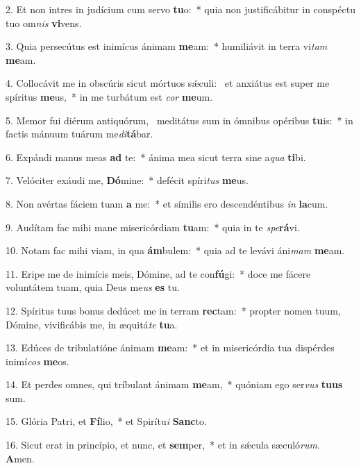 2. Et non intres in judícium cum servo \textbf{tu}o:~*  quia non justificábitur in conspéctu tuo om\textit{nis} \textbf{vi}vens.\

3. Quia persecútus est inimícus ánimam \textbf{me}am:~*  humiliávit in terra vi\textit{tam} \textbf{me}am.\

4. Collocávit me in obscúris sicut mórtuos sǽculi: \dag\  et anxiátus est super me spíritus \textbf{me}us,~*  in me turbátum est \textit{cor} \textbf{me}um.\

5. Memor fui diérum antiquórum, \dag\  meditátus sum in ómnibus opéribus \textbf{tu}is:~*  in factis mánuum tuárum me\textit{di}\textbf{tá}bar.\

6. Expándi manus meas \textbf{ad} te:~*  ánima mea sicut terra sine a\textit{qua} \textbf{ti}bi.\

7. Velóciter exáudi me, \textbf{Dó}mine:~*  defécit spíri\textit{tus} \textbf{me}us.\

8. Non avértas fáciem tuam \textbf{a} me:~*  et símilis ero descendéntibus \textit{in} \textbf{la}cum.\

9. Audítam fac mihi mane misericórdiam \textbf{tu}am:~*  quia in te \textit{spe}\textbf{rá}vi.\

10. Notam fac mihi viam, in qua \textbf{ám}bulem:~*  quia ad te levávi áni\textit{mam} \textbf{me}am.\

11. Eripe me de inimícis meis, Dómine, ad te con\textbf{fú}gi:~*  doce me fácere voluntátem tuam, quia Deus me\textit{us} \textbf{es} tu.\

12. Spíritus tuus bonus dedúcet me in terram \textbf{rec}tam:~*  propter nomen tuum, Dómine, vivificábis me, in æquitá\textit{te} \textbf{tu}a.\

13. Edúces de tribulatióne ánimam \textbf{me}am:~*  et in misericórdia tua dispérdes inimí\textit{cos} \textbf{me}os.\

14. Et perdes omnes, qui tríbulant ánimam \textbf{me}am,~*  quóniam ego ser\textit{vus} \textbf{tu}\textbf{us} sum.\

15. Glória Patri, et \textbf{Fí}lio,~*  et Spirítu\textit{i} \textbf{Sanc}to.\

16. Sicut erat in princípio, et nunc, et \textbf{sem}per,~*  et in sǽcula sæculó\textit{rum}. \textbf{A}men.\

